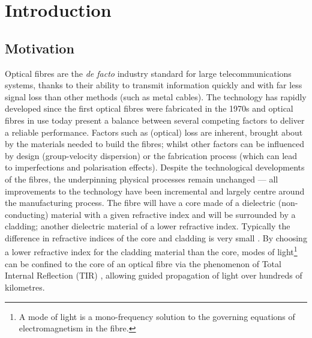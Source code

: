 \chapter{Introduction} \label{ch:Intro}

\section{Motivation} \label{sec:ProjectMotivation}
Optical fibres are the \textit{de facto} industry standard for large telecommunications systems, thanks to their ability to transmit information quickly and with far less signal loss than other methods (such as metal cables).
The technology has rapidly developed since the first optical fibres were fabricated in the 1970s \cite{knight2003photonic} and optical fibres in use today present a balance between several competing factors to deliver a reliable performance.
Factors such as (optical) loss are inherent, brought about by the materials needed to build the fibres; whilst other factors can be influenced by design (group-velocity dispersion) or the fabrication process (which can lead to imperfections and polarisation effects).
Despite the technological developments of the fibres, the underpinning physical processes remain unchanged --- all improvements to the technology have been incremental and largely centre around the manufacturing process.
The fibre will have a core made of a dielectric (non-conducting) material with a given refractive index and will be surrounded by a cladding; another dielectric material of a lower refractive index.
Typically the difference in refractive indices of the core and cladding is very small . 
By choosing a lower refractive index for the cladding material than the core, modes of light\footnote{A mode of light is a mono-frequency solution to the governing equations of electromagnetism in the fibre.} can be confined to the core of an optical fibre via the phenomenon of Total Internal Reflection (TIR) , allowing guided propagation of light over  hundreds of kilometres.\newline

